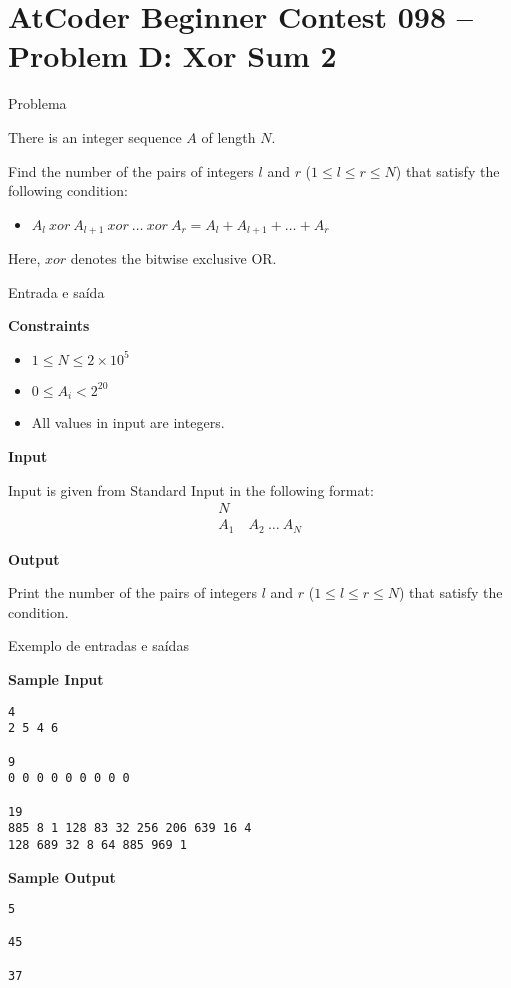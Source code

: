 \section{AtCoder Beginner Contest 098 -- Problem D: Xor Sum 2}

\begin{frame}[fragile]{Problema}

There is an integer sequence $A$ of length $N$.

Find the number of the pairs of integers $l$ and $r$ ($1\leq l\leq r\leq N$) that satisfy the 
following condition:

\begin{itemize}
    \item $A_l\ xor\ A_{l + 1}\ xor\ \ldots\ xor\ A_r = A_l + A_{l + 1} + \ldots + A_r$
\end{itemize}

Here, $xor$ denotes the bitwise exclusive OR.
\end{frame}

\begin{frame}[fragile]{Entrada e saída}

\textbf{Constraints}

\begin{itemize}
    \item $1\leq N \leq 2\times 10^5$
    \item $0\leq A_i < 2^{20}$
    \item All values in input are integers.
\end{itemize}

\textbf{Input}

Input is given from Standard Input in the following format:
\begin{align*}
N &\\
A_1 &\ A_2\ \ldots\ A_N
\end{align*}

\textbf{Output}

Print the number of the pairs of integers $l$ and $r$ ($1\leq l\leq r\leq N$) that satisfy the 
condition.

\end{frame}

\begin{frame}[fragile]{Exemplo de entradas e saídas}

\begin{minipage}[t]{0.6\textwidth}
\textbf{Sample Input}
\begin{verbatim}
4
2 5 4 6

9
0 0 0 0 0 0 0 0 0

19
885 8 1 128 83 32 256 206 639 16 4
128 689 32 8 64 885 969 1
\end{verbatim}
\end{minipage}
\begin{minipage}[t]{0.35\textwidth}
\textbf{Sample Output}
\begin{verbatim}
5

45

37
\end{verbatim}
\end{minipage}
\end{frame}

